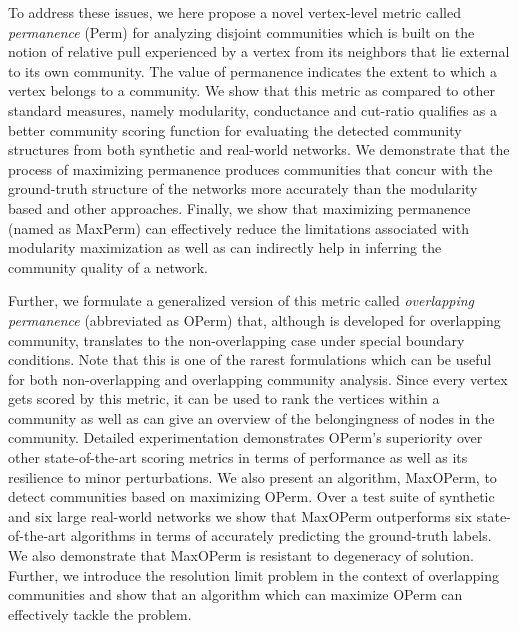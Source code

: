 To address these issues, we here propose a novel vertex-level metric called {\em permanence} (Perm) for analyzing disjoint communities which
is built on the 
notion of relative pull experienced by a vertex from its neighbors that lie external to its own community. The value of permanence
indicates the extent to which a vertex belongs to a community. We show that this metric as
compared to
other standard measures, namely modularity, conductance and cut-ratio qualifies as a better community scoring function for evaluating the
detected community structures from both synthetic and real-world networks. We demonstrate that the process of maximizing permanence produces
communities that concur with the ground-truth structure of the networks more accurately than the modularity based and other approaches.
Finally, we show that maximizing permanence (named as MaxPerm) can effectively reduce the limitations associated with modularity
maximization as well as can indirectly help in inferring the community quality of a network.

Further, we formulate a generalized version of this metric called {\em overlapping permanence} (abbreviated as OPerm) that, although is
developed for overlapping community, translates to the non-overlapping case under special boundary conditions. Note that this is one of
the rarest formulations which can be useful for both non-overlapping and overlapping community analysis. Since every
vertex gets scored by this metric, it can be used to rank the vertices within a community as well as can give an overview of the
belongingness of nodes in the community. Detailed experimentation demonstrates OPerm's superiority over other state-of-the-art scoring
metrics in terms of performance as well as its resilience to minor perturbations. We also present an algorithm, MaxOPerm, to detect
communities
based on maximizing OPerm. Over a test suite of synthetic and six large real-world networks we show that MaxOPerm outperforms six
state-of-the-art algorithms in terms of accurately predicting the ground-truth labels. We also demonstrate that MaxOPerm is resistant to
degeneracy of solution. Further, we introduce the resolution limit problem in the context of overlapping communities and show that an
algorithm which can maximize OPerm can effectively tackle the problem.



